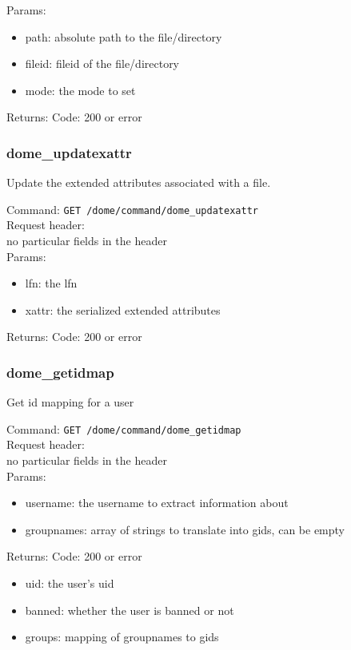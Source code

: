 \documentclass[a4paper,10pt]{scrreprt}
\begin{document}
Params:
\begin{itemize}
  \item path: absolute path to the file/directory
  \item fileid: fileid of the file/directory
  \item mode: the mode to set
\end{itemize}

Returns:
Code: 200 or error



\subsubsection{dome\_updatexattr}

Update the extended attributes associated with a file.

Command:
\lstinline"GET /dome/command/dome_updatexattr"\\

Request header:\\
no particular fields in the header\\

Params:
\begin{itemize}
  \item lfn: the lfn
  \item xattr: the serialized extended attributes
\end{itemize}

Returns:
Code: 200 or error

\subsubsection{dome\_getidmap}

Get id mapping for a user

Command:
\lstinline"GET /dome/command/dome_getidmap"\\

Request header:\\
no particular fields in the header\\

Params:
\begin{itemize}
 \item username: the username to extract information about
 \item groupnames: array of strings to translate into gids, can be empty
\end{itemize}

Returns:
Code: 200 or error
\begin{itemize}
 \item uid: the user's uid
 \item banned: whether the user is banned or not
 \item groups: mapping of groupnames to gids
\end{itemize}
\end{document}
